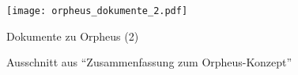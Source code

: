 \documentclass[a5paper,pagesize,numbers=noenddot]{scrbook}
\begin{document}
\begin{figure}
   \centering
   \texttt{[image: orpheus\_dokumente\_2.pdf]}
   \caption{Dokumente zu Orpheus (2)}
   \label{fig:orpheus_dokumente_2}
\end{figure}

\begin{figure}
   \centering
   \caption{Ausschnitt aus \enquote{Zusammenfassung zum Orpheus-Konzept}}
   \label{fig:orpheus_spielfigurenanimation}
\end{figure}
\end{document}
